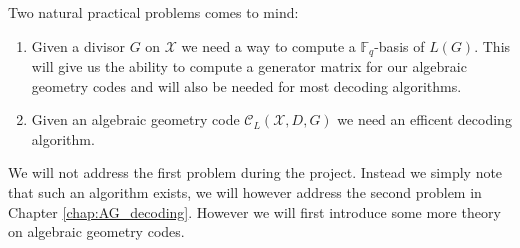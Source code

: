 Two natural practical problems comes to mind:
\begin{enumerate}
  \item Given a divisor $G$ on $\mathcal{X}$ we need a way to compute a $\mathbb{F}_q$-basis of $L(G)$. This will give us the ability to compute a generator matrix for our algebraic geometry codes and will also be needed for most decoding algorithms.

  \item Given an algebraic geometry code $\mathcal{C}_L(\mathcal{X}, D, G)$ we need an efficent decoding algorithm.
\end{enumerate}
We will not address the first problem during the project. Instead we simply note that such an algorithm exists, we will however address the second problem in Chapter \ref{chap:AG_decoding}. However we will first introduce some more theory on algebraic geometry codes.



%
